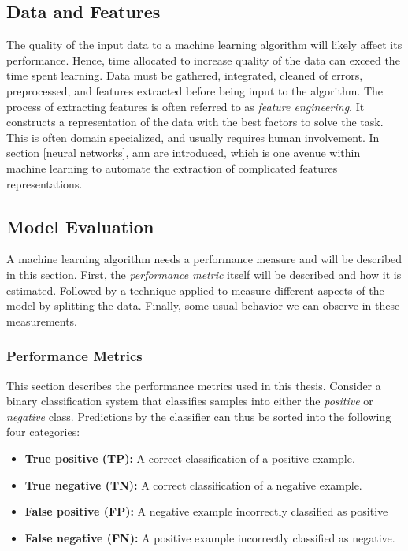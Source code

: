     \subsection{Data and Features}
    The quality of the input data to a machine learning algorithm will likely affect its performance\cite{najafabadi2015deep}. Hence, time allocated to increase quality of the data can exceed the time spent learning.  Data must be gathered, integrated, cleaned of errors, preprocessed, and features extracted before being input to the algorithm. The process of extracting features is often referred to as \textit{feature engineering}. It constructs a representation of the data with the best factors to solve the task. This is often domain specialized, and usually requires human involvement. In section \ref{neural networks}, \gls{ann} are introduced, which is one avenue within machine learning to automate the extraction of complicated features representations.

    \subsection{Model Evaluation}
    A machine learning algorithm needs a performance measure and will be described in this section. First, the \textit{performance metric} itself will be described and how it is estimated. Followed by a technique applied to measure different aspects of the model by splitting the data. Finally, some usual behavior we can observe in these measurements.
    
    \subsubsection{Performance Metrics} \label{f1_score}
        This section describes the performance metrics used in this thesis. Consider a binary classification system that classifies samples into either the \textit{positive} or \textit{negative} class\cite{powers2020evaluation_f1_recall_precision}. Predictions by the classifier can thus be sorted into the following four categories:
        
        \begin{itemize}
            \item \textbf{True positive (TP):} A correct classification of a positive example.
            \item \textbf{True negative (TN):} A correct classification of a negative example.
            \item \textbf{False positive (FP):} A negative example incorrectly classified as positive
            \item \textbf{False negative (FN):} A positive example incorrectly classified as negative.
            \end{itemize}
        
